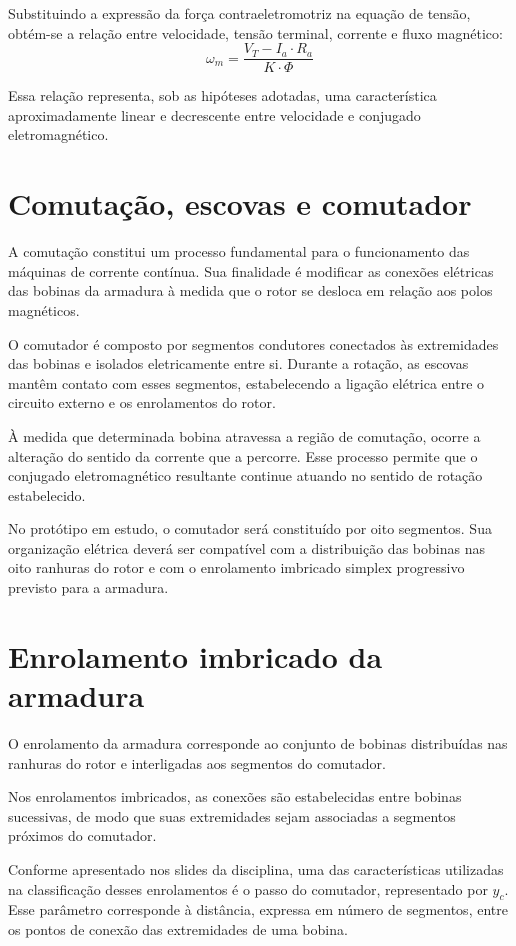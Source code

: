 \documentclass[12pt,openright,oneside,a4paper,brazilian]{abntex2}
\begin{document}
Substituindo a expressão da força contraeletromotriz na equação de tensão, obtém-se a relação entre velocidade, tensão terminal, corrente e fluxo magnético:
\begin{equation}
\omega_m = \frac{V_T - I_a \cdot R_a}{K \cdot \Phi}
\label{velocidade}
\end{equation}

Essa relação representa, sob as hipóteses adotadas, uma característica aproximadamente linear e decrescente entre velocidade e conjugado eletromagnético.

\section{Comutação, escovas e comutador}
A comutação constitui um processo fundamental para o funcionamento das máquinas de corrente contínua. Sua finalidade é modificar as conexões elétricas das bobinas da armadura à medida que o rotor se desloca em relação aos polos magnéticos.

O comutador é composto por segmentos condutores conectados às extremidades das bobinas e isolados eletricamente entre si. Durante a rotação, as escovas mantêm contato com esses segmentos, estabelecendo a ligação elétrica entre o circuito externo e os enrolamentos do rotor.

À medida que determinada bobina atravessa a região de comutação, ocorre a alteração do sentido da corrente que a percorre. Esse processo permite que o conjugado eletromagnético resultante continue atuando no sentido de rotação estabelecido.

No protótipo em estudo, o comutador será constituído por oito segmentos. Sua organização elétrica deverá ser compatível com a distribuição das bobinas nas oito ranhuras do rotor e com o enrolamento imbricado simplex progressivo previsto para a armadura.
\section{Enrolamento imbricado da armadura}
O enrolamento da armadura corresponde ao conjunto de bobinas distribuídas nas ranhuras do rotor e interligadas aos segmentos do comutador.

Nos enrolamentos imbricados, as conexões são estabelecidas entre bobinas sucessivas, de modo que suas extremidades sejam associadas a segmentos próximos do comutador.

Conforme apresentado nos slides da disciplina, uma das características utilizadas na classificação desses enrolamentos é o passo do comutador, representado por \(y_c\). Esse parâmetro corresponde à distância, expressa em número de segmentos, entre os pontos de conexão das extremidades de uma bobina.
\end{document}

